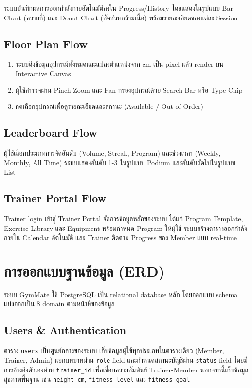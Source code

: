 ระบบบันทึกผลการออกกำลังกายอัตโนมัติลงใน Progress/History โดยแสดงในรูปแบบ Bar Chart (ความถี่) และ Donut Chart (สัดส่วนกล้ามเนื้อ) พร้อมรายละเอียดของแต่ละ Session

\subsection{Floor Plan Flow}
\label{subsec:floorplan-flow}

\begin{enumerate}
  \item ระบบดึงข้อมูลอุปกรณ์ทั้งหมดและแปลงตำแหน่งจาก cm เป็น pixel แล้ว render บน Interactive Canvas
  \item ผู้ใช้สำรวจผ่าน Pinch Zoom และ Pan กรองอุปกรณ์ด้วย Search Bar หรือ Type Chip
  \item กดเลือกอุปกรณ์เพื่อดูรายละเอียดและสถานะ (Available / Out-of-Order)
\end{enumerate}

\subsection{Leaderboard Flow}
\label{subsec:leaderboard-flow}

ผู้ใช้เลือกประเภทการจัดอันดับ (Volume, Streak, Program) และช่วงเวลา (Weekly, Monthly, All Time) ระบบแสดงอันดับ 1-3 ในรูปแบบ Podium และอันดับถัดไปในรูปแบบ List

\subsection{Trainer Portal Flow}
\label{subsec:trainer-flow}

Trainer login เข้าสู่ Trainer Portal จัดการข้อมูลหลักของระบบ ได้แก่ Program Template, Exercise Library และ Equipment พร้อมกำหนด Program ให้ผู้ใช้ ระบบสร้างตารางออกกำลังกายใน Calendar อัตโนมัติ และ Trainer ติดตาม Progress ของ Member แบบ real-time

\section{การออกแบบฐานข้อมูล (ERD)}
\label{sec:erd}

\noindent
ระบบ GymMate ใช้ PostgreSQL เป็น relational database หลัก \cite{postgres} โดยออกแบบ schema แบ่งออกเป็น 8 domain ตามหน้าที่ของข้อมูล

\subsection{Users \& Authentication}
ตาราง \texttt{users} เป็นศูนย์กลางของระบบ เก็บข้อมูลผู้ใช้ทุกประเภทในตารางเดียว (Member, Trainer, Admin) แยกบทบาทผ่าน \texttt{role} field และกำหนดสถานะบัญชีผ่าน \texttt{status} field โดยมีการอ้างอิงตัวเองผ่าน \texttt{trainer\_id} เพื่อเชื่อมความสัมพันธ์ Trainer-Member นอกจากนี้เก็บข้อมูลสุขภาพพื้นฐาน เช่น \texttt{height\_cm}, \texttt{fitness\_level} และ \texttt{fitness\_goal}

